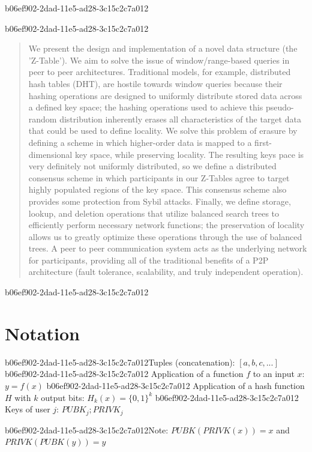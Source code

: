 \documentclass[12pt]{article}
\begin{document}
b06ef902-2dad-11e5-ad28-3c15c2c7a012
\maketitle
b06ef902-2dad-11e5-ad28-3c15c2c7a012
\begin{abstract}
We present the design and implementation of a novel data structure (the 'Z-Table'). We aim to solve the issue of window/range-based queries in peer to peer architectures. Traditional models, for example,  distributed hash tables (DHT), are hostile towards window queries because their hashing operations are designed to uniformly distribute stored data across a defined key space; the hashing operations used to achieve this pseudo-random distribution inherently erases all characteristics of the target data that could be used to define locality. We solve this problem of erasure by defining a scheme in which higher-order data is mapped to a first-dimensional key space, while preserving locality. The resulting keys pace is very definitely not uniformly distributed, so we define a distributed consensus scheme in which participants in our Z-Tables agree to target highly populated regions of the key space. This consensus scheme also provides some protection from Sybil attacks. Finally, we define storage, lookup, and deletion operations that utilize balanced search trees to efficiently perform necessary network functions; the preservation of locality allows us to greatly optimize these operations through the use of balanced trees. A peer to peer communication system acts as the underlying network for participants, providing all of the traditional benefits of a P2P architecture (fault tolerance, scalability, and truly independent operation).
\end{abstract}
b06ef902-2dad-11e5-ad28-3c15c2c7a012
\section{Notation}

b06ef902-2dad-11e5-ad28-3c15c2c7a012Tuples (concatenation): $[a,b,c,...]$
b06ef902-2dad-11e5-ad28-3c15c2c7a012
Application of a function $f$ to an input $x$: $y=f(x)$
b06ef902-2dad-11e5-ad28-3c15c2c7a012
Application of a hash function $H$ with $k$ output bits: $H_{k}(x) = \{0,1\}^k$
b06ef902-2dad-11e5-ad28-3c15c2c7a012
Keys of user $j$: $ PUBK_j; PRIVK_j $

b06ef902-2dad-11e5-ad28-3c15c2c7a012Note: $PUBK(PRIVK(x)) = x$ and $PRIVK(PUBK(y)) = y$~
\end{document}
